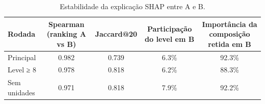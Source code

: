 \begin{table}[htbp]
\caption{Estabilidade da explicação SHAP entre A e B.}
\label{tab:abshap}
\centering
\small
\begin{tabular}{lcccc}
\toprule
Rodada & Spearman (ranking A vs B) & Jaccard@20 & Participação do level em B & Importância da composição retida em B \\
\midrule
Principal & 0.982 & 0.739 & 6.3\% & 92.3\% \\
Level ≥ 8 & 0.978 & 0.818 & 6.2\% & 88.3\% \\
Sem unidades & 0.971 & 0.818 & 7.9\% & 92.2\% \\
\bottomrule
\end{tabular}
\end{table}
